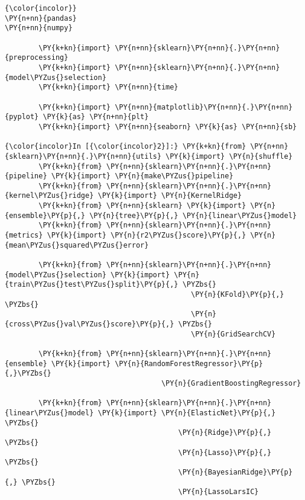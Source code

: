 \begin{Verbatim}[commandchars=\\\{\}]
{\color{incolor}}  
\PY{n+nn}{pandas}
\PY{n+nn}{numpy} 

        \PY{k+kn}{import} \PY{n+nn}{sklearn}\PY{n+nn}{.}\PY{n+nn}{preprocessing}
        \PY{k+kn}{import} \PY{n+nn}{sklearn}\PY{n+nn}{.}\PY{n+nn}{model\PYZus{}selection}
        \PY{k+kn}{import} \PY{n+nn}{time}
        
        \PY{k+kn}{import} \PY{n+nn}{matplotlib}\PY{n+nn}{.}\PY{n+nn}{pyplot} \PY{k}{as} \PY{n+nn}{plt}
        \PY{k+kn}{import} \PY{n+nn}{seaborn} \PY{k}{as} \PY{n+nn}{sb}

{\color{incolor}In [{\color{incolor}2}]:} \PY{k+kn}{from} \PY{n+nn}{sklearn}\PY{n+nn}{.}\PY{n+nn}{utils} \PY{k}{import} \PY{n}{shuffle}
        \PY{k+kn}{from} \PY{n+nn}{sklearn}\PY{n+nn}{.}\PY{n+nn}{pipeline} \PY{k}{import} \PY{n}{make\PYZus{}pipeline}
        \PY{k+kn}{from} \PY{n+nn}{sklearn}\PY{n+nn}{.}\PY{n+nn}{kernel\PYZus{}ridge} \PY{k}{import} \PY{n}{KernelRidge}
        \PY{k+kn}{from} \PY{n+nn}{sklearn} \PY{k}{import} \PY{n}{ensemble}\PY{p}{,} \PY{n}{tree}\PY{p}{,} \PY{n}{linear\PYZus{}model}
        \PY{k+kn}{from} \PY{n+nn}{sklearn}\PY{n+nn}{.}\PY{n+nn}{metrics} \PY{k}{import} \PY{n}{r2\PYZus{}score}\PY{p}{,} \PY{n}{mean\PYZus{}squared\PYZus{}error}
        
        \PY{k+kn}{from} \PY{n+nn}{sklearn}\PY{n+nn}{.}\PY{n+nn}{model\PYZus{}selection} \PY{k}{import} \PY{n}{train\PYZus{}test\PYZus{}split}\PY{p}{,} \PYZbs{}
                                            \PY{n}{KFold}\PY{p}{,} \PYZbs{}
                                            \PY{n}{cross\PYZus{}val\PYZus{}score}\PY{p}{,} \PYZbs{}
                                            \PY{n}{GridSearchCV}
        
        \PY{k+kn}{from} \PY{n+nn}{sklearn}\PY{n+nn}{.}\PY{n+nn}{ensemble} \PY{k}{import} \PY{n}{RandomForestRegressor}\PY{p}{,}\PYZbs{}
                                     \PY{n}{GradientBoostingRegressor}
        
        \PY{k+kn}{from} \PY{n+nn}{sklearn}\PY{n+nn}{.}\PY{n+nn}{linear\PYZus{}model} \PY{k}{import} \PY{n}{ElasticNet}\PY{p}{,} \PYZbs{}
                                         \PY{n}{Ridge}\PY{p}{,} \PYZbs{}
                                         \PY{n}{Lasso}\PY{p}{,} \PYZbs{}
                                         \PY{n}{BayesianRidge}\PY{p}{,} \PYZbs{}
                                         \PY{n}{LassoLarsIC}
                        

\end{Verbatim}
